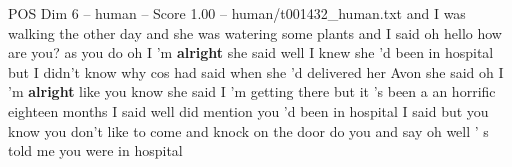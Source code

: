 \begin{textsample}{POS Dim 6 – human – Score 1.00 – human/t001432\_human.txt}  \label{ex:f6_pos_008}
and I was walking the other day and she was watering some plants and I said oh hello how are you? as you do oh I 'm \textbf{alright} she said well I knew she 'd been in hospital but I didn't know why cos had said when she 'd delivered her Avon she said oh I 'm \textbf{alright} like you know she said I 'm getting there but it 's been a an horrific eighteen months I said well did mention you 'd been in hospital I said but you know you don't like to come and knock on the door do you and say oh well ' s told me you were in hospital

\end{textsample}
